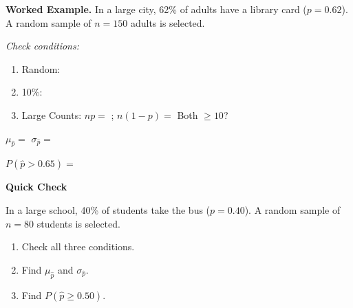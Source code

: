 \documentclass[10pt]{article}
\begin{document}
\begin{notesbox}
\textbf{Worked Example.} In a large city, 62\% of adults have a library card ($p = 0.62$).
A random sample of $n = 150$ adults is selected.

\medskip
\textit{Check conditions:}
\begin{enumerate}
  \item Random: 
  \item 10\%: 
  \item Large Counts: $np = $ \blank{0.8in}; $n(1-p) = $ \blank{0.8in} Both $\ge 10$?~\blank{0.3in}
\end{enumerate}

\medskip
$\mu_{\hat{p}} = $ \blank{0.6in} \hspace{1cm} $\sigma_{\hat{p}} = $ \blank{1.5in}

\medskip
$P(\hat{p} > 0.65) = $ 
\end{notesbox}

\begin{practicebox}
\textbf{Quick Check}

In a large school, 40\% of students take the bus ($p = 0.40$). A random sample of
$n = 80$ students is selected.
\begin{enumerate}
  \item Check all three conditions.
  \item Find $\mu_{\hat{p}}$ and $\sigma_{\hat{p}}$.
        \vspace{0.5in}
  \item Find $P(\hat{p} \ge 0.50)$.
        \vspace{0.8in}
\end{enumerate}
\end{practicebox}
\end{document}
